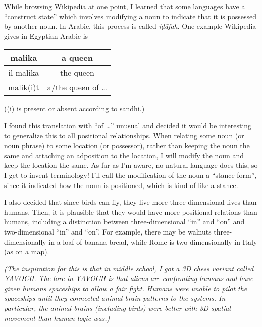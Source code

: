 \documentclass[12pt]{article}
\begin{document}
    While browsing Wikipedia at one point,
    I learned that some languages have a ``construct state''
    which involves modifying a noun to indicate
    that it is possessed by another noun.
    In Arabic, this process is called \textit{iḍāfah}.
    One example Wikipedia gives in Egyptian Arabic is
    \begin{center}
        \begin{tabular}{|c|c|}
            \hline
            malika    & a queen              \\
            \hline
            il-malika & the queen            \\
            \hline
            malik(i)t & a/the queen of \dots \\
            \hline
        \end{tabular}
    \end{center}
    ((i) is present or absent according to sandhi.)

    I found this translation with ``of \dots'' unusual
    and decided it would be interesting to generalize this to
    all positional relationships.
    When relating some noun (or noun phrase) to some location (or possessor),
    rather than keeping the noun the same
    and attaching an adposition to the location,
    I will modify the noun and keep the location the same.
    As far as I'm aware, no natural language does this,
    so I get to invent terminology!
    I'll call the modification of the noun
    a ``stance form'',
    since it indicated how the noun is positioned,
    which is kind of like a stance.

    I also decided that since birds can fly,
    they live more three-dimensional lives than humans.
    Then, it is plausible that they would have
    more positional relations than humans,
    including a distinction between three-dimensional ``in'' and ``on''
    and two-dimensional ``in'' and ``on''.
    For example,
    there may be walnuts three-dimensionally in a loaf of banana bread,
    while Rome is two-dimensionally in Italy (as on a map).

    \textit{
        (The inspiration for this is that in middle school,
        I got a 3D chess variant called YAVOCH.
        The lore in YAVOCH is that aliens are confronting humans
        and have given humans spaceships to allow a fair fight.
        Humans were unable to pilot the spaceships until
        they connected animal brain patterns to the systems.
        In particular,
        the animal brains (including birds) were better with 3D spatial movement
        than human logic was.)
    }
\end{document}

